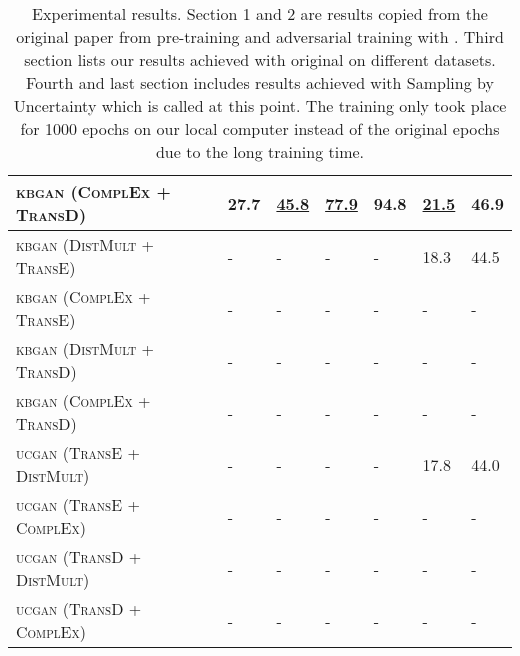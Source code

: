 \begin{table}[h]
\begin{tabular}{lllllll}
        \textsc{kbgan} (\textsc{ComplEx} + \textsc{TransD})   
        & 27.7 & \textbf{\underline{45.8}} & \underline{77.9}
        & 94.8 & \underline{21.5} & 46.9\\
        
         \midrule
          
          \textsc{kbgan} (\textsc{DistMult} + \textsc{TransE})  & -  & - & - & - & 18.3 & 44.5 \\
          
          \textsc{kbgan} (\textsc{ComplEx} + \textsc{TransE})  & -  & - & - & - & - & - \\
          
          \textsc{kbgan} (\textsc{DistMult} + \textsc{TransD})  & -  & - & - & - & - & - \\
          
          \textsc{kbgan} (\textsc{ComplEx} + \textsc{TransD})  & -  & - & - & - & - & - \\
          
          \midrule
         
          \textsc{ucgan} (\textsc{TransE} + \textsc{DistMult}) 
          & -  & - & - & - & 17.8 & 44.0\\
         
         \textsc{ucgan} (\textsc{TransE} + \textsc{ComplEx}) 
          & -  & - & - & - & - & - \\
          
          \textsc{ucgan} (\textsc{TransD} + \textsc{DistMult}) 
          & -  & - & - & - & - & - \\
        
        \textsc{ucgan} (\textsc{TransD} + \textsc{ComplEx}) 
          & -  & - & - & - & - & - \\
          
        \bottomrule
    \end{tabular}
    \caption{Experimental results.
    Section 1 and 2 are results copied from the original paper \cite{cai2017kbgan} from pre-training and adversarial training with \kbgan. 
    Third section lists our results achieved with original \kbgan on different datasets.
    Fourth and last section includes results achieved with Sampling by Uncertainty which is called \ucgan at this point.
    The training only took place for 1000 epochs on our local computer instead of the original  epochs due to the long training time.}
\label{tab:results}
\end{table}